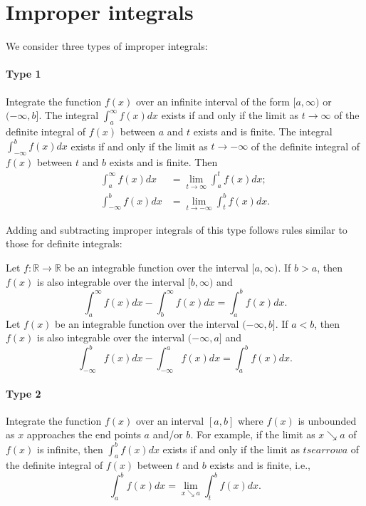 \section{Improper integrals}
We consider three types of improper integrals:

\paragraph{Type 1}
Integrate the function $ f(x) $ over an infinite interval of the form
    $ [a, \infty) $ or $ (-\infty, b] $.
The integral $ \int_{a}^{\infty} f(x) dx $ exists if and only if the limit as
    $ t \rightarrow \infty $ of the definite integral of $ f(x) $ between $ a $
    and $ t $ exists and is finite.
The integral $ \int_{-\infty}^{b} f(x) dx $ exists if and only if the limit as
    $ t \rightarrow -\infty $ of the definite integral of $ f(x) $ between $ t $
    and $ b $ exists and is finite.
Then
\begin{align*}
    \int_{a}^{\infty} f(x) dx &= \lim_{t \rightarrow \infty} \int_{a}^{t} f(x)
        dx; \\
    \int_{-\infty}^{b} f(x) dx &= \lim_{t \rightarrow -\infty} \int_{t}^{b}
        f(x) dx.
\end{align*}

Adding and subtracting improper integrals of this type follows rules similar to
    those for definite integrals:
\begin{lemma}
    Let $ f : \mathbb{R} \rightarrow \mathbb{R} $ be an integrable function over
        the interval $ [a, \infty) $.
    If $ b > a $, then $ f(x) $ is also integrable over the interval
        $ [b, \infty) $ and
    \begin{equation*}
        \int_{a}^{\infty} f(x) dx - \int_{b}^{\infty} f(x) dx =
            \int_{a}^{b} f(x) dx.
    \end{equation*}
    Let $ f(x) $ be an integrable function over the interval $ (-\infty, b] $.
    If $ a < b $, then $ f(x) $ is also integrable over the interval
        $ (-\infty, a] $ and
    \begin{equation*}
        \int_{-\infty}^{b} f(x) dx - \int_{-\infty}^{a} f(x) dx =
            \int_{a}^{b} f(x) dx.
    \end{equation*}
\end{lemma}

\paragraph{Type 2}
Integrate the function $ f(x) $ over an interval $ [a, b] $ where $ f(x) $ is
    unbounded as $ x $ approaches the end points $ a $ and/or $ b $.
For example, if the limit as $ x \searrow a $ of $ f(x) $ is infinite, then
    $ \int_{a}^{b} f(x) dx $ exists if and only if the limit as $ t searrow a $
    of the definite integral of $ f(x) $ between $ t $ and $ b $ exists and is
    finite, i.e.,
    \begin{equation*}
        \int_{a}^{b} f(x) dx = \lim_{x \searrow a} \int_{t}^{b} f(x) dx.
    \end{equation*}

